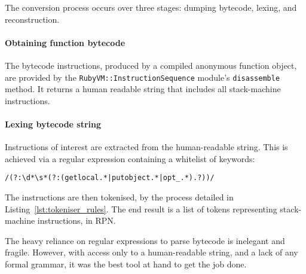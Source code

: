 The conversion process occurs over three stages: dumping bytecode, lexing, and reconstruction.

\paragraph*{Obtaining function bytecode}
The bytecode instructions, produced by a compiled anonymous function object, are provided by the \verb|RubyVM::InstructionSequence| module's \verb|disassemble| method.
It returns a human readable string that includes all stack-machine instructions.

\paragraph*{Lexing bytecode string}
Instructions of interest are extracted from the human-readable string. This is achieved via a regular expression containing a whitelist of keywords:
\begin{verbatim}
/(?:\d*\s*(?:(getlocal.*|putobject.*|opt_.*).?))/
\end{verbatim}

The instructions are then tokenised, by the process detailed in Listing~\ref{lst:tokeniser_rules}.
The end result is a list of tokens representing stack-machine instructions, in \ac{RPN}.

The heavy reliance on regular expressions to parse bytecode is inelegant and fragile.
However, with access only to a human-readable string, and a lack of any formal grammar, it was the best tool at hand to get the job done.

